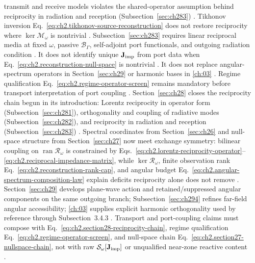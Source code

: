 transmit and receive models violates the shared-operator assumption behind reciprocity in radiation and reception (Subsection~\ref{sec:ch283}) \cite{stratton1941}. Tikhonov inversion
Eq.~\eqref{eq:ch2.tikhonov-source-reconstruction} does not restore reciprocity where
\(\ker\mathcal{M}_\omega\) is nontrivial \cite{harrington2001}.
Subsection~\ref{sec:ch283} requires linear reciprocal media at fixed \(\omega\), passive
\(\mathcal{B}_\Gamma\), self-adjoint port functionals, and outgoing radiation condition
\cite{stratton1941}. It does not identify unique \(\mathbf{J}_{\mathrm{imp}}\) from port data when
Eq.~\eqref{eq:ch2.reconstruction-null-space} is nontrivial \cite{stratton1941}. It does not
replace angular-spectrum operators in Section~\ref{sec:ch29} or harmonic bases in
\ref{ch:03} \cite{stratton1941}. Regime
qualification Eq.~\eqref{eq:ch2.regime-operator-screen} remains mandatory before transport
interpretation of port coupling \cite{stratton1941}. \medskip
\noindent
Section~\ref{sec:ch28} closes the reciprocity chain begun in its introduction:
Lorentz reciprocity in operator form (Subsection~\ref{sec:ch281}),
orthogonality and coupling of radiative modes (Subsection~\ref{sec:ch282}), and
reciprocity in radiation and reception (Subsection~\ref{sec:ch283})
\cite{stratton1941}. Spectral coordinates
from Section~\ref{sec:ch26} and null-space structure from Section~\ref{sec:ch27} now meet
exchange symmetry: bilinear coupling on \(\operatorname{ran}\mathcal{R}_\omega\) is constrained
by Eqs.~\eqref{eq:ch2.lorentz-reciprocity-operator}--\eqref{eq:ch2.reciprocal-impedance-matrix},
while \(\ker\mathcal{R}_\omega\), finite observation rank
Eq.~\eqref{eq:ch2.reconstruction-rank-cap}, and angular budget
Eq.~\eqref{eq:ch2.angular-spectrum-composition-law} explain deficits reciprocity alone does not
remove \cite{stratton1941}. Section~\ref{sec:ch29} develops plane-wave action and
retained/suppressed angular components on the same outgoing branch; Subsection~\ref{sec:ch294}
refines far-field angular accessibility; \ref{ch:03} supplies explicit harmonic
orthogonality used by reference through Subsection~3.4.3
\cite{harrington2001}. Transport and port-coupling claims must compose with
Eq.~\eqref{eq:ch2.section28-reciprocity-chain}, regime qualification
Eq.~\eqref{eq:ch2.regime-operator-screen}, and null-space chain
Eq.~\eqref{eq:ch2.section27-nullspace-chain}, not with raw \(\mathcal{S}_\omega[\mathbf{J}_{\mathrm{imp}}]\) or
unqualified near-zone reactive content \cite{stratton1941}.
